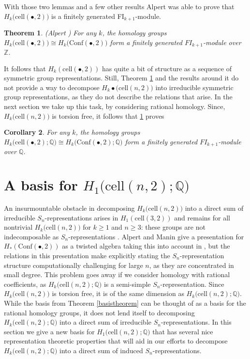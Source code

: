 \documentclass[12py]{amsart}%
\newtheorem{thm}{Theorem}[section]
\newtheorem{cor}[thm]{Corollary}
\theoremstyle{definition}\newtheorem{definition}[thm]{Definition}
\theoremstyle{definition}
\newcommand{\Z}{\ensuremath{\mathbb{Z}}}
\newcommand{\Q}{\ensuremath{\mathbb{Q}}}
\begin{document}
With those two lemmas and a few other results Alpert was able to prove that $H_{k}\big(\text{cell}(\bullet,2)\big)$ is a finitely generated FI$_{k+1}$-module.

\begin{thm}\label{AlpertsBIGTheorem}
(Alpert \cite[Theorem 6.1]{alpert2020generalized}) For any $k$, the homology groups $H_{k}\big(\text{cell}(\bullet,2)\big)\cong H_{k}\big(\text{Conf}(\bullet,2)\big)$ form a finitely generated $FI_{k+1}$-module over $\Z$.
\end{thm}

It follows that $H_{k}(\text{cell}(\bullet,2))$ has quite a bit of structure as a sequence of symmetric group representations. Still, Theorem \ref{AlpertsBIGTheorem} and the results around it do not provide a way to decompose $H_{k}\bullet(\text{cell}(n,2)\big)$ into irreducible symmetric group representations, as they do not describe the relations that arise. In the next section we take up this task, by considering rational homology. Since, $H_{k}\big(\text{cell}(n,2)\big)$ is torsion free, it follows that \ref{AlpertsBIGTheorem} proves

\begin{cor}\label{AlpertsBIGTheoremcor}
For any $k$, the homology groups $H_{k}\big(\text{cell}(\bullet,2);\Q\big)\cong H_{k}\big(\text{Conf}(\bullet,2);\Q\big)$ form a finitely generated $FI_{k+1}$-module over $\Q$.
\end{cor}

\section{A basis for $H_{1}\big(\text{cell}(n,2);\Q\big)$} \label{newH1basis}

An insurmountable obstacle in decomposing $H_{k}\big(\text{cell}(n,2)\big)$ into a direct sum of irreducible $S_{n}$-representations arises in $H_{1}(\text{cell}(3,2))$ and remains for all nontrivial $H_{k}\big(\text{cell}(n,2)\big)$ for $k\ge 1$ and $n\ge 3$: these groups are not indecomposable as $S_{n}$-representations \cite[Theorem 8.3]{alpert2021configuration1}. Alpert and Manin give a presentation for $H_{*}(\text{Conf}(\bullet,2))$ as a twisted algebra taking this into account in \cite[Theorem 8.3]{alpert2021configuration1}, but the relations in this presentation make explicitly stating the $S_{n}$-representation structure computationally challenging for large $n$, as they are concentrated in small degree. This problem goes away if we consider homology with rational coefficients, as $H_{k}\big(\text{cell}(n,2);\Q\big)$ is a semi-simple $S_{n}$-representation. Since $H_{k}\big(\text{cell}(n,2)\big)$ is torsion free, it is of the same dimension as $H_{k}\big(\text{cell}(n,2);\Q\big)$. While the basis from Theorem \ref{basistheorem} can be thought of as a basis for the rational homology groups, it does not lend itself to decomposing $H_{k}\big(\text{cell}(n,2);\Q\big)$ into a direct sum of irreducible $S_{n}$-representations. In this section we give a new basis for $H_{1}\big(\text{cell}(n,2);\Q\big)$ that has several nice representation theoretic properties that will aid in our efforts to decompose $H_{k}\big(\text{cell}(n,2);\Q\big)$ into a direct sum of induced $S_{n}$-representations.
\end{document}
